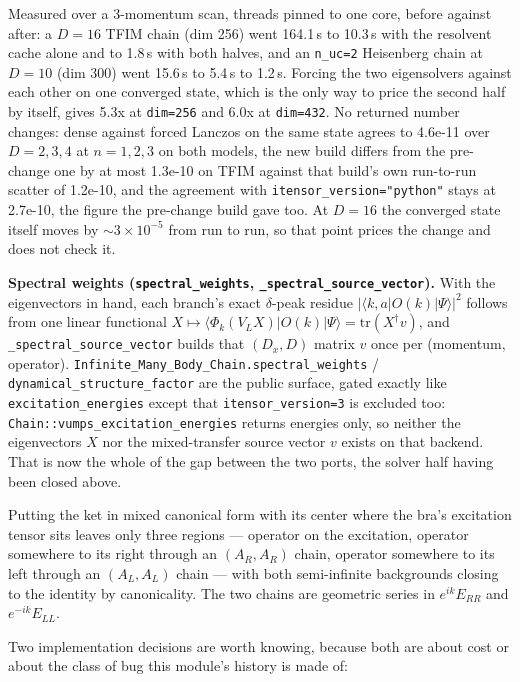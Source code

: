 \documentclass[11pt]{article}
\begin{document}
Measured over a 3-momentum scan, threads pinned to one core, before
against after: a $D=16$ TFIM chain (dim 256) went 164.1\,s to 10.3\,s
with the resolvent cache alone and to 1.8\,s with both halves, and an
\texttt{n\_uc=2} Heisenberg chain at $D=10$ (dim 300) went 15.6\,s to
5.4\,s to 1.2\,s. Forcing the two eigensolvers against each other on one
converged state, which is the only way to price the second half by
itself, gives 5.3x at \texttt{dim=256} and 6.0x at \texttt{dim=432}. No
returned number changes: dense against forced Lanczos on the same state
agrees to 4.6e-11 over $D=2,3,4$ at $n=1,2,3$ on both models, the new
build differs from the pre-change one by at most 1.3e-10 on TFIM against
that build's own run-to-run scatter of 1.2e-10, and the agreement with
\texttt{itensor\_version="python"} stays at 2.7e-10, the figure the
pre-change build gave too. At $D=16$ the converged state itself moves by
${\sim}3\times10^{-5}$ from run to run, so that point prices the change
and does not check it.

\textbf{Spectral weights (\texttt{spectral\_weights},
\texttt{\_spectral\_source\_vector}).} With the eigenvectors in hand,
each branch's exact $\delta$-peak residue $|\langle
k,a|O(k)|\Psi\rangle|^2$ follows from one linear functional $X \mapsto
\langle\Phi_k(V_L X)|O(k)|\Psi\rangle = \mathrm{tr}(X^\dagger v)$, and
\texttt{\_spectral\_source\_vector} builds that $(D_x, D)$ matrix $v$
once per (momentum, operator).
\texttt{Infinite\_Many\_Body\_Chain.spectral\_weights} /
\texttt{dynamical\_structure\_factor} are the public surface, gated
exactly like \texttt{excitation\_energies} except that
\texttt{itensor\_version=3} is excluded too:
\texttt{Chain::vumps\_excitation\_energies} returns energies only, so
neither the eigenvectors $X$ nor the mixed-transfer source vector $v$
exists on that backend. That is now the whole of the gap between the two
ports, the solver half having been closed above.

Putting the ket in mixed canonical form with its center where the bra's
excitation tensor sits leaves only three regions --- operator on the
excitation, operator somewhere to its right through an $(A_R,A_R)$
chain, operator somewhere to its left through an $(A_L,A_L)$ chain ---
with both semi-infinite backgrounds closing to the identity by
canonicality. The two chains are geometric series in $e^{ik}E_{RR}$ and
$e^{-ik}E_{LL}$.

Two implementation decisions are worth knowing, because both are about
cost or about the class of bug this module's history is made of:
\end{document}
